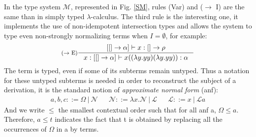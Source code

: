 \documentclass{article}
\def\sysm{system $\mathcal{M}$}
\begin{document}
In the type \sysm, represented in Fig. \ref{SM}, rules (Var) and ($\rightarrow$ I) are the same than in simply typed $\lambda$-calculus. The third rule is the interesting one, it implements the use of non-idempotent intersection types and allows the system to type even non-strongly normalizing terms when $I = \emptyset$, for example:
\begin{displaymath}
    \inference[($\rightarrow$ E)]{[[] \rightarrow \alpha] \vdash x : [] \rightarrow \rho}{x : [[] \rightarrow \alpha] \vdash x((\lambda y.yy)(\lambda y.yy)) : \alpha}
\end{displaymath}
The term is typed, even if some of its subterms remain untyped. Thus a notation for these untyped subterms is needed in order to reconstruct the subject of a derivation, it is the standard notion of \emph{approximate normal form} (anf):
\begin{align*}
    a,b,c ::= \Omega\ |\ \mathcal{N} 
    && \mathcal{N} ::= \lambda x.\mathcal{N}\ |\ \mathcal{L}
    && \mathcal{L} ::= x\ |\ \mathcal{L}a
\end{align*}
And we write $\leq$ the smallest contextual order such that for all anf a, $\Omega \leq a$. Therefore, $a \leq t$ indicates the fact that t is obtained by replacing all the occurrences of $\Omega$ in a by terms.
\end{document}
